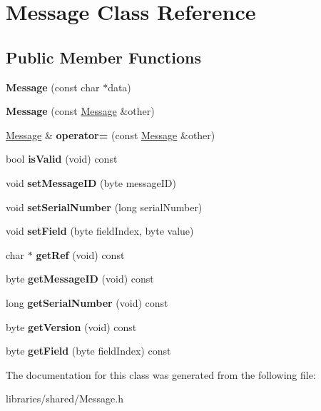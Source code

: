 \hypertarget{class_message}{}\section{Message Class Reference}
\label{class_message}
\subsection*{Public Member Functions}
\begin{DoxyCompactItemize}
\item 
\mbox{\label{class_message_aec5a347226767ace5a847ec36cf4cb6e}} 
{\bfseries Message} (const char $\ast$data)
\item 
\mbox{\label{class_message_ad253b20930e70257e2523bb9fc7d299c}} 
{\bfseries Message} (const \hyperlink{class_message}{Message} \&other)
\item 
\mbox{\label{class_message_a8003315e3355d1b0a5e3b7dcd5a0514c}} 
\hyperlink{class_message}{Message} \& {\bfseries operator=} (const \hyperlink{class_message}{Message} \&other)
\item 
\mbox{\label{class_message_af407831ce53b83a977e8dbb7a902e0bc}} 
bool {\bfseries is\+Valid} (void) const
\item 
\mbox{\label{class_message_a2c948cdf42d496672caa748f77e948b3}} 
void {\bfseries set\+Message\+ID} (byte message\+ID)
\item 
\mbox{\label{class_message_ae69c95c2861dc3b1dad77a8eedf201aa}} 
void {\bfseries set\+Serial\+Number} (long serial\+Number)
\item 
\mbox{\label{class_message_a1b3a30ce05e52e632c4aa534998bf249}} 
void {\bfseries set\+Field} (byte field\+Index, byte value)
\item 
\mbox{\label{class_message_a5e020499c73b95476b21831041741af6}} 
char $\ast$ {\bfseries get\+Ref} (void) const
\item 
\mbox{\label{class_message_a892a0dd767ad97ec75fff2d53f970edd}} 
byte {\bfseries get\+Message\+ID} (void) const
\item 
\mbox{\label{class_message_ad60a67a1359824f00b9e665e6d6922e2}} 
long {\bfseries get\+Serial\+Number} (void) const
\item 
\mbox{\label{class_message_a529096e3e9ddd6b61cdfc17e168b813d}} 
byte {\bfseries get\+Version} (void) const
\item 
\mbox{\label{class_message_a0b8e317427a7edaaa3347e6cb36eee31}} 
byte {\bfseries get\+Field} (byte field\+Index) const
\end{DoxyCompactItemize}


The documentation for this class was generated from the following file\+:\begin{DoxyCompactItemize}
\item 
libraries/shared/Message.\+h\end{DoxyCompactItemize}
